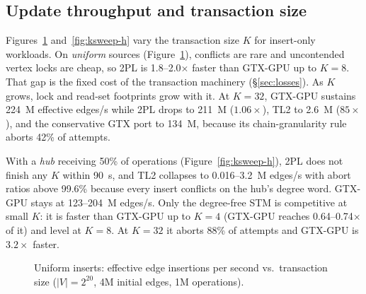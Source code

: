 \documentclass[sigconf,nonacm]{acmart}
\newcommand{\sys}{GTX-GPU}
\begin{document}
\subsection{Update throughput and transaction size}
Figures~\ref{fig:ksweep-u} and~\ref{fig:ksweep-h} vary the transaction size $K$ for insert-only workloads. On
\emph{uniform} sources (Figure~\ref{fig:ksweep-u}), conflicts are rare and uncontended vertex locks are cheap, so 2PL is
1.8--2.0$\times$ faster than \sys{} up to $K{=}8$. That gap is the fixed cost of the transaction machinery
(\S\ref{sec:losses}). As $K$ grows, lock and read-set footprints grow with it. At $K{=}32$, \sys{} sustains 224~M
effective edges/s while 2PL drops to 211~M ($1.06\times$), TL2 to 2.6~M ($85\times$), and the conservative GTX port to
134~M, because its chain-granularity rule aborts 42\% of attempts.

With a \emph{hub} receiving 50\% of operations (Figure~\ref{fig:ksweep-h}), 2PL does not finish any $K$ within 90~s, and
TL2 collapses to 0.016--3.2~M edges/s with abort ratios above 99.6\% because every insert conflicts on the hub's degree
word. \sys{} stays at 123--204~M edges/s. Only the degree-free STM is competitive at small $K$: it is faster than \sys{}
up to $K{=}4$ (\sys{} reaches 0.64--0.74$\times$ of it) and level at $K{=}8$. At $K{=}32$ it aborts 88\% of attempts
and \sys{} is $3.2\times$ faster.


\begin{figure}[t]
\centering
{}
\caption{Uniform inserts: effective edge insertions per second vs.\ transaction size ($|V|{=}2^{20}$, 4M initial edges,
1M operations).}
\label{fig:ksweep-u}
\end{figure}
\end{document}
